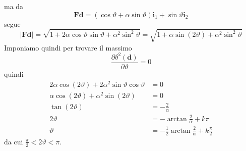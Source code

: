 \documentclass[10pt,a4paper,twoside]{book}
\begin{document}
ma da
\begin{equation*}
\mathbf{Fd} =(\cos \vartheta +\alpha \sin \vartheta )\mathbf{i}_{1} +\sin \vartheta \mathbf{i}_{2}
\end{equation*}
segue
\begin{equation*}
| \mathbf{Fd}| =\sqrt{1+2\alpha \cos \vartheta \sin \vartheta +\alpha ^{2}\sin^{2} \vartheta } =\sqrt{1+\alpha \sin (2\vartheta )+\alpha ^{2}\sin^{2} \vartheta }
\end{equation*}
Imponiamo quindi per trovare il massimo
\begin{equation*}
\frac{\partial \delta ^{2} (\mathbf{d} )}{\partial \vartheta } =0
\end{equation*}
quindi
\begin{align*}
2\alpha \cos (2\vartheta )+2\alpha ^{2}\sin \vartheta \cos \vartheta  & =0\\
\alpha \cos (2\vartheta )+\alpha ^{2}\sin (2\vartheta ) & =0\\
\tan (2\vartheta ) & =-\frac{2}{\alpha }\\
2\vartheta  & =-\arctan\frac{2}{\alpha } +k\pi \\
\vartheta  & =-\frac{1}{2}\arctan\frac{2}{\alpha } +k\frac{\pi }{2}
\end{align*}
da cui $\frac{\pi }{2} < 2\vartheta < \pi $.
\end{document}
